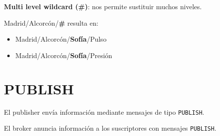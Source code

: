 \documentclass[xcolor={x11names}]{beamer}
\begin{document}
\begin{frame}{\secname}
    \textbf{Multi level wildcard (\#)}:
    nos permite sustituir muchos niveles.

    \vspace{1em}

    
    \begin{minipage}{.51\textwidth} %
        {\color{Firebrick3}Madrid}/{\color{Gold3}Alcorcón}/{\color{DodgerBlue3}\textbf{\#}} resulta en:

        \begin{itemize}
            \item {\color{Firebrick3}Madrid}/{\color{Gold3}Alcorcón}/{\color{DodgerBlue3}\textbf{Sofía}}/{\color{OliveDrab4}Pulso}
            \item {\color{Firebrick3}Madrid}/{\color{Gold3}Alcorcón}/{\color{DodgerBlue3}\textbf{Sofía}}/{\color{OliveDrab4}Presión}
        \end{itemize}
    \end{minipage}
    \begin{minipage}{.4\textwidth} %
        \begin{figure}
            
        \end{figure}
    \end{minipage}
\end{frame}






\section{PUBLISH}
\begin{frame}{\secname}
    El publisher envía información mediante
    mensajes de tipo \texttt{PUBLISH}.

    \vspace{1em}

    \begin{figure}
        
    \end{figure}
    
\end{frame}



\begin{frame}{\secname}
    El broker anuncia información
    a los suscriptores con
    mensajes \texttt{PUBLISH}.

    \vspace{1em}

    \begin{figure}
        
    \end{figure}
\end{frame}
\end{document}
